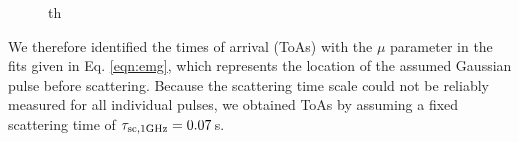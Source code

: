 \documentclass[fleqn,usenatbib]{mnras}
\begin{document}
\begin{figure}{th}
                  \label{fig:stacked_spectra}
\end{figure}

We therefore identified the times of arrival (ToAs) with the $\mu$ parameter in the fits given in Eq. \eqref{eqn:emg}, which represents the location of the assumed Gaussian pulse before scattering.
Because the scattering time scale could not be reliably measured for all individual pulses, we obtained ToAs by assuming a fixed scattering time of $\tau_{\rm sc,1 GHz} = 0.07\,$s.

\end{document}
